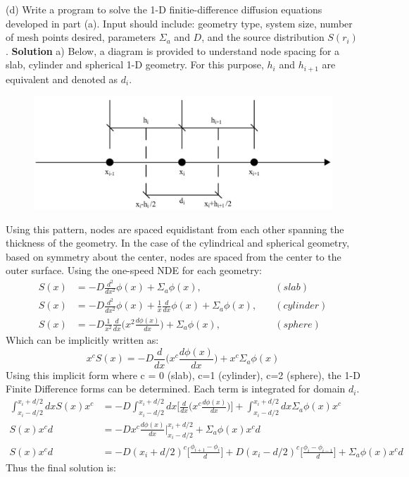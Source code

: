 \documentclass{amsart}
\theoremstyle{definition}
\begin{document}
\bigbreak
(d) Write a program to solve the 1-D finitie-difference diffusion equations developed in part (a). Input should include: geometry type, system size, number of mesh points desired, parameters $\Sigma_a$ and $D$, and the source distribution $S(r_i)$.\newline
\bigbreak
\newpage
\textbf{Solution}
\bigbreak
a) Below, a diagram is provided to understand node spacing for a slab, cylinder and spherical 1-D geometry. For this purpose, $h_i$ and $h_{i+1}$ are equivalent and denoted as $d_i$.
\bigbreak
\begin{figure}[h!]
                \includegraphics[width=.7\linewidth]{FD2.JPG}
\end{figure}
Using this pattern, nodes are spaced equidistant from each other spanning the thickness of the geometry. In the case of the cylindrical and spherical geometry, based on symmetry about the center, nodes are spaced from the center to the outer surface. Using the one-speed NDE for each geometry:
\begin{align*}
    S(x) &= -D\frac{d^2}{dx^2}\phi(x) + \Sigma_a\phi(x), \quad &(slab)  \\
    S(x) &= -D\frac{d^2}{dx^2}\phi(x) + \frac{1}{x}\frac{d}{dx}\phi(x) +\Sigma_a\phi(x), \quad &(cylinder) \\
    S(x) &= -D\frac{1}{x^2}\frac{d}{dx}\bigg(x^2 \frac{d\phi(x)}{dx}\bigg) +\Sigma_a\phi(x), \quad &(sphere)
\end{align*}
Which can be implicitly written as:
\begin{equation*}
    x^c S(x) = -D\frac{d}{dx}\bigg(x^c\frac{d\phi(x)}{dx}\bigg)+x^c\Sigma_a\phi(x)
\end{equation*}
Using this implicit form where c = 0 (slab), c=1 (cylinder), c=2 (sphere), the 1-D Finite Difference forms can be determined. Each term is integrated for domain $d_i$.
\begin{align*}
    \int_{x_i-d/2}^{x_i+d/2}dxS(x)x^c  &= -D\int_{x_i-d/2}^{x_i+d/2}dx\bigg[\frac{d}{dx}\bigg(x^c\frac{d\phi(x)}{dx}\bigg)\bigg]+\int_{x_i-d/2}^{x_i+d/2}dx \Sigma_a\phi(x)x^c\\
    S(x)x^cd &= -Dx^c\frac{d\phi(x)}{dx}\Biggr|_{x_i-d/2}^{x_i+d/2}+\Sigma_a\phi(x)x^cd\\
    S(x)x^cd &= -D(x_i+d/2)^c\bigg[\frac{\phi_{i+1}-\phi_i}{d}\bigg]+D(x_i-d/2)^c\bigg[\frac{\phi_i-\phi_{i-1}}{d}\bigg]+\Sigma_a\phi(x)x^cd
\end{align*}
\bigbreak
Thus the final solution is:
 
\end{document}
